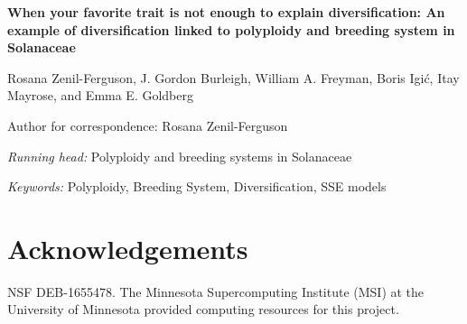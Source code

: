 \documentclass[11pt]{article}
\begin{document}

\begin{center}
    \textbf{When your favorite trait is not enough to explain diversification: An example of diversification linked to polyploidy and breeding system in Solanaceae}
\end{center}

\vfill

\noindent
Rosana Zenil-Ferguson,%
%
\noindent
J. Gordon Burleigh,%
%
\noindent
William A. Freyman,%
%
\noindent
Boris Igi\'c,%
%
\noindent
Itay Mayrose,%
%
and
Emma E. Goldberg%

\vfill

\theendnotes

\noindent
Author for correspondence: Rosana Zenil-Ferguson

\vfill

\noindent
\textit{Running head:} Polyploidy and breeding systems in Solanaceae

\vfill

\noindent
\textit{Keywords:} 
Polyploidy,
Breeding System,
Diversification, SSE models

\vfill

\linenumbers


\clearpage



\clearpage





\section{Acknowledgements}

NSF DEB-1655478.
The Minnesota Supercomputing Institute (MSI) at the University of Minnesota provided computing resources for this project.


\clearpage


\setstretch{\stretchby}

\end{document}
